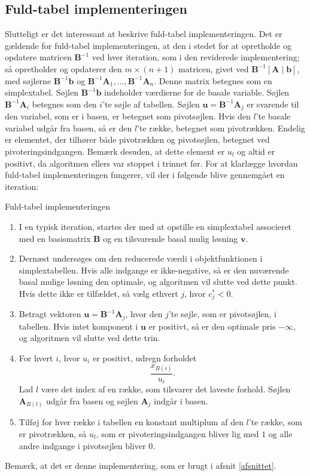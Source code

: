 \subsection{Fuld-tabel implementeringen}
Slutteligt er det interessant at beskrive fuld-tabel implementeringen. 
Det er gældende for fuld-tabel implementeringen, at den i stedet for at opretholde og opdatere matricen $\mathbf{B}^{-1}$ ved hver iteration, som i den reviderede implementering; så opretholder og opdaterer den $m \times (n+1)$ matricen, givet ved $\mathbf{B}^{-1} \left [ \mathbf{A} \mid \mathbf{b} \right ]$, med søjlerne $\mathbf{B}^{-1}\mathbf{b}$ og $\mathbf{B}^{-1}\mathbf{A}_1,\ldots,\mathbf{B}^{-1}\mathbf{A}_n$. 
Denne matrix betegnes som en simplextabel.
Søjlen $\mathbf{B}^{-1}\mathbf{b}$ indeholder værdierne for de basale variable.
Søjlen $\mathbf{B}^{-1}\mathbf{A}_i$ betegnes som den $i$'te søjle af tabellen.
Søjlen $\mathbf{u} = \mathbf{B}^{-1}\mathbf{A}_j$ er svarende til den variabel, som er i basen, er betegnet som pivotsøjlen. 
Hvis den $l$'te basale variabel udgår fra basen, så er den $l$'te række, betegnet som pivotrækken. 
Endelig er elementet, der tilhører både pivotrækken og pivotsøjlen, betegnet ved pivoteringsindgangen.
Bemærk desuden, at dette element er $u_l$ og altid er positivt, da algoritmen ellers var stoppet i trinnet før. 
For at klarlægge hvordan fuld-tabel implementeringen fungerer, vil der i følgende blive gennemgået en iteration: 
%
\begin{col}{Fuld-tabel implementeringen}{}
\begin{enumerate}
\item I en typisk iteration, startes der med at opstille en simplextabel associeret med en basismatrix $\mathbf{B}$ og en tilsvarende basal mulig løsning $\mathbf{v}.$
\item Dernæst undersøges om den reducerede værdi i objektfunktionen i simplextabellen.
Hvis alle indgange er ikke-negative, så er den nuværende basal mulige løsning den optimale, og algoritmen vil slutte ved dette punkt.
Hvis dette ikke er tilfældet, så vælg ethvert $j$, hvor $c_j^* < 0$.
\item Betragt vektoren $\mathbf{u}=\mathbf{B}^{-1}\mathbf{A}_j$, hvor den $j$'te søjle, som er pivotsøjlen, i tabellen. Hvis intet komponent i $\mathbf{u}$ er positivt, så er den optimale pris $-\infty$, og algoritmen vil slutte ved dette trin. 
\item For hvert $i$, hvor $u_i$ er positivt, udregn forholdet $$\frac{x_{B(i)}}{u_i}.$$ Lad $l$ være det index  af en række, som tilsvarer det laveste forhold.
Søjlen $\mathbf{A}_{B(l)}$ udgår fra basen og søjlen $\mathbf{A}_j$ indgår i basen. 
\item Tilføj for hver række i tabellen en konstant multiplum af den $l$'te række, som er pivotrækken, så $u_l$, som er pivoteringsindgangen bliver lig med $1$ og alle andre indgange i pivotsøjlen bliver $0$. 
\end{enumerate}
\end{col}
\noindent
%
Bemærk, at det er denne implementering, som er brugt i afsnit \ref{afsnittet}.